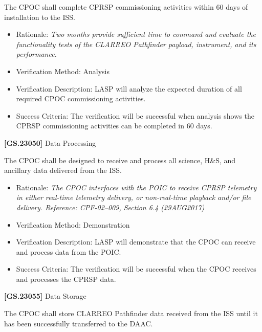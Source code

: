 \documentclass[12pt,oneside,oldfontcommands]{memoir}
\begin{document}
The \gls{CPOC} shall complete \gls{CPRSP} commissioning activities within 60 days of installation to the \gls{ISS}.

\begin{itemize}
\item{} Rationale: \emph{Two months provide sufficient time to command and evaluate the functionality tests of the CLARREO Pathfinder payload, instrument, and its performance.}

\item{} Verification Method: Analysis

\item{} Verification Description: \gls{LASP} will analyze the expected duration of all required \gls{CPOC} commissioning activities.

\item{} Success Criteria: The verification will be successful when \gls{analysis} shows the \gls{CPRSP} commissioning activities can be completed in 60 days.

\end{itemize}

\textbf{[GS.23050]} Data Processing

The \gls{CPOC} shall be designed to receive and process all science, H\&S, and ancillary data delivered from the \gls{ISS}.

\begin{itemize}
\item{} Rationale: \emph{The CPOC interfaces with the POIC to receive CPRSP telemetry in either real-time telemetry delivery, or non-real-time playback and\slash or file delivery. Reference: CPF-02--009, Section 6.4 (29AUG2017)}

\item{} Verification Method: Demonstration

\item{} Verification Description: \gls{LASP} will demonstrate that the \gls{CPOC} can receive and process data from the \gls{POIC}.

\item{} Success Criteria: The verification will be successful when the \gls{CPOC} receives and processes the \gls{CPRSP} data.

\end{itemize}

\textbf{[GS.23055]} Data Storage

The \gls{CPOC} shall store \gls{CLARREO} Pathfinder data received from the \gls{ISS} until it has been successfully transferred to the \gls{DAAC}.
\end{document}
